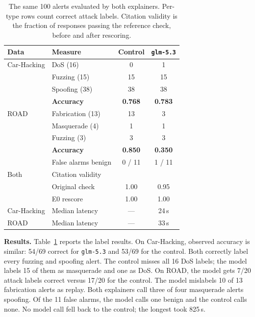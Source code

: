 \documentclass[sigconf]{acmart}
\begin{document}
\begin{table}[t]
  \caption{The same 100 alerts evaluated by both explainers. Per-type rows count correct attack labels. Citation validity is the fraction of responses passing the reference check, before and after rescoring.}
  \label{tab:explain}
  \small
  \begin{tabular}{llcc}
    \toprule
    Data & Measure & Control & \texttt{glm-5.3} \\
    \midrule
    Car-Hacking & DoS (16) & 0 & 1 \\
     & Fuzzing (15) & 15 & 15 \\
     & Spoofing (38) & 38 & 38 \\
     & \textbf{Accuracy} & \textbf{0.768} & \textbf{0.783} \\
    \midrule
    ROAD & Fabrication (13) & 13 & 3 \\
     & Masquerade (4) & 1 & 1 \\
     & Fuzzing (3) & 3 & 3 \\
     & \textbf{Accuracy} & \textbf{0.850} & \textbf{0.350} \\
     & False alarms benign & 0 / 11 & 1 / 11 \\
    \midrule
    Both & Citation validity & & \\
     & \quad Original check & 1.00 & 0.95 \\
     & \quad E0 rescore & 1.00 & 1.00 \\
    \midrule
    Car-Hacking & Median latency & --- & 24\,s \\
    ROAD & Median latency & --- & 33\,s \\
    \bottomrule
  \end{tabular}
\end{table}

\textbf{Results.} Table~\ref{tab:explain} reports the label results. On Car-Hacking, observed accuracy is similar: 54/69 correct for \texttt{glm-5.3} and 53/69 for the control. Both correctly label every fuzzing and spoofing alert. The control misses all 16 DoS labels; the model labels 15 of them as masquerade and one as DoS. On ROAD, the model gets 7/20 attack labels correct versus 17/20 for the control. The model mislabels 10 of 13 fabrication alerts as replay. Both explainers call three of four masquerade alerts spoofing. Of the 11 false alarms, the model calls one benign and the control calls none. No model call fell back to the control; the longest took 825\,s.
\end{document}
